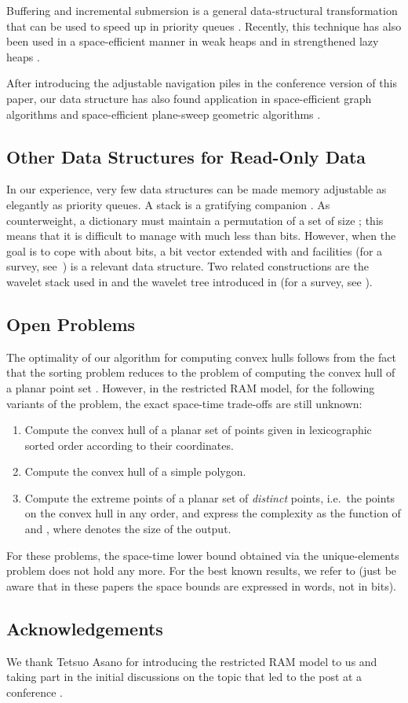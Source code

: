 \documentclass[final,onetabnum,onefignum,onethmnum]{siamltex}
\newcommand{\Insert}{\mbox{}}
\newcommand{\Rank}{\mbox{}}
\newcommand{\Select}{\mbox{}}
\begin{document}
Buffering and incremental submersion is a general data-structural
transformation that can be used to speed up \Insert{} in priority
queues \cite{AHRT05}.  Recently, this technique has also been used in a
space-efficient manner in weak heaps \cite{EEK13} and in strengthened
lazy heaps \cite{EEK15}.

After introducing the adjustable navigation piles in the conference version of this paper, 
our data structure has also found application in space-efficient graph algorithms
\cite{EHK15} and space-efficient plane-sweep geometric algorithms \cite{EK15}.

\subsection{Other Data Structures for Read-Only Data} 
In our experience, very few data structures can be made memory
adjustable as elegantly as priority queues. A stack is a gratifying
companion \cite{BKLSS15}.  As counterweight, a dictionary must maintain a
permutation of a set of size ; this means that it is difficult to
manage with much less than  bits. However, when the
goal is to cope with about  bits, a bit vector extended with \Rank{}
and \Select{} facilities (for a survey, see~\cite{NP12}) is a
relevant data structure.  Two related constructions are the wavelet
stack used in \cite{EJKS14} and the wavelet tree introduced in
\cite{GGV03} (for a survey, see \cite{Nav12}).

\subsection{Open Problems}

The optimality of our algorithm for computing convex hulls follows
from the fact that the sorting problem reduces to the problem of
computing the convex hull of a planar point set \cite[Section
  3.2]{PS85}. However, in the restricted RAM model, for the following
variants of the problem, the exact space-time trade-offs are still
unknown:
\begin{enumerate}
\item Compute the convex hull of a planar set of points given in
  lexicographic sorted order according to their coordinates.
\item Compute the convex hull of a simple polygon. 
\item Compute the extreme points of a planar set of  \emph{distinct} points,
  i.e.~the points on the convex hull in any order, and express the
  complexity as the function of  and , where  denotes the
  size of the output.
\end{enumerate}
For these problems, the space-time lower bound obtained via the
unique-elements problem \cite[Section 10.13.7]{Sav08} does not hold any more.
For the best known results, we refer to \cite{BKLSS15,CC07} (just be
aware that in these papers the space bounds are expressed in words,
not in bits).


\subsection*{Acknowledgements}

We thank Tetsuo Asano for introducing the restricted RAM model to us
and taking part in the initial discussions on the topic that led to
the post at a conference \cite{AEK13}.



\end{document}
